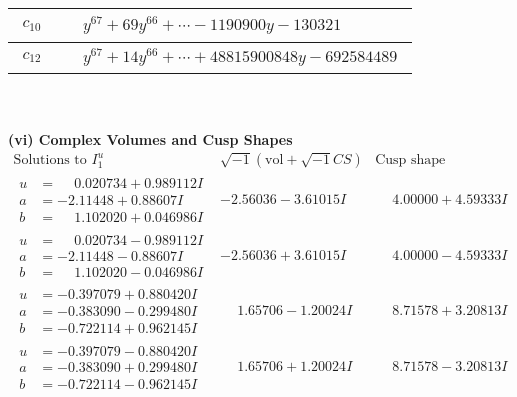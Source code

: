 \documentclass[1p]{elsarticle_modified}
\theoremstyle{definition}
\newcommand{\I}{\sqrt{-1}}
\begin{document}
\begin{tabular}{m{50pt}|m{274pt}}
\hline $$\begin{aligned}c_{10}\end{aligned}$$&$\begin{aligned}
&y^{67}+69 y^{66}+\cdots-1190900 y-130321
\end{aligned}$\\
\hline $$\begin{aligned}c_{12}\end{aligned}$$&$\begin{aligned}
&y^{67}+14 y^{66}+\cdots+48815900848 y-692584489
\end{aligned}$\\
\hline
\end{tabular}\\~\\
\newpage\flushleft \textbf{(vi) Complex Volumes and Cusp Shapes}
$$\begin{array}{c|c|c}  
\text{Solutions to }I^u_{1}& \I (\text{vol} + \sqrt{-1}CS) & \text{Cusp shape}\\
 \hline 
\begin{aligned}
u &= \phantom{-}0.020734 + 0.989112 I \\
a &= -2.11448 + 0.88607 I \\
b &= \phantom{-}1.102020 + 0.046986 I\end{aligned}
 & -2.56036 - 3.61015 I & \phantom{-}4.00000 + 4.59333 I \\ \hline\begin{aligned}
u &= \phantom{-}0.020734 - 0.989112 I \\
a &= -2.11448 - 0.88607 I \\
b &= \phantom{-}1.102020 - 0.046986 I\end{aligned}
 & -2.56036 + 3.61015 I & \phantom{-}4.00000 - 4.59333 I \\ \hline\begin{aligned}
u &= -0.397079 + 0.880420 I \\
a &= -0.383090 - 0.299480 I \\
b &= -0.722114 + 0.962145 I\end{aligned}
 & \phantom{-}1.65706 - 1.20024 I & \phantom{-}8.71578 + 3.20813 I \\ \hline\begin{aligned}
u &= -0.397079 - 0.880420 I \\
a &= -0.383090 + 0.299480 I \\
b &= -0.722114 - 0.962145 I\end{aligned}
 & \phantom{-}1.65706 + 1.20024 I & \phantom{-}8.71578 - 3.20813 I \\ \hline\begin{aligned}

\end{aligned}
\end{array}$$
\end{document}
